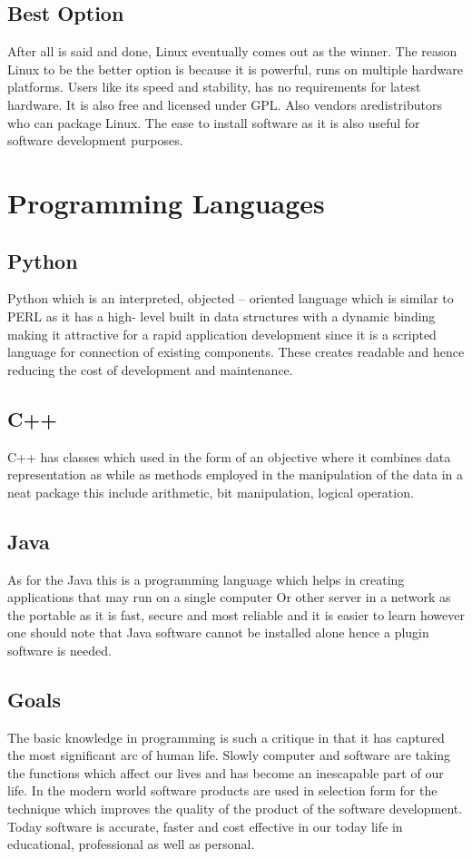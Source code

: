 \documentclass{scrreprt}
\begin{document}
\subsection{Best Option}
After all is said and done, Linux eventually comes out as the winner. The reason Linux to be the better
option is because it is powerful, runs on multiple hardware platforms. Users like its speed and stability,
has no requirements for latest hardware. It is also free and licensed under GPL. Also vendors aredistributors who can package Linux. The ease to install software as it is also useful for software
development purposes.


\section{Programming Languages}

\subsection{Python}
Python which is an interpreted, objected – oriented language which is similar to PERL as it has a high-
level built in data structures with a dynamic binding making it attractive for a rapid application
development since it is a scripted language for connection of existing components. These creates
readable and hence reducing the cost of development and maintenance.

\subsection{C++}
C++ has classes which used in the form of an objective where it combines data representation as while
as methods employed in the manipulation of the data in a neat package this include arithmetic, bit
manipulation, logical operation.

\subsection{Java}
As for the Java this is a programming language which helps in creating applications that may run on a
single computer Or other server in a network as the portable as it is fast, secure and most reliable and it
is easier to learn however one should note that Java software cannot be installed alone hence a plugin
software is needed.

\subsection{Goals}
The basic knowledge in programming is such a critique in that it has captured the most significant arc of
human life. Slowly computer and software are taking the functions which affect our lives and has
become an inescapable part of our life. In the modern world software products are used in selection
form for the technique which improves the quality of the product of the software development. Today
software is accurate, faster and cost effective in our today life in educational, professional as well as
personal.
\end{document}
